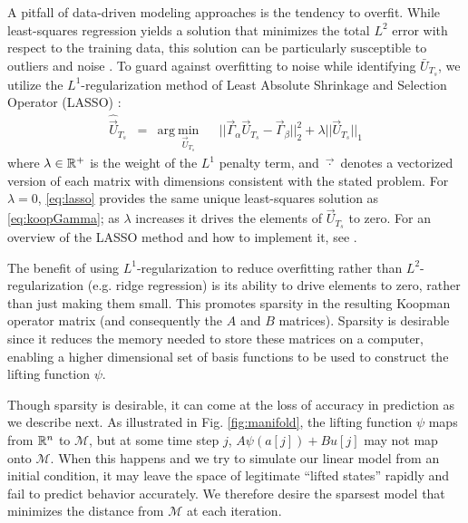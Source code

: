 A pitfall of data-driven modeling approaches is the tendency to overfit.
While least-squares regression yields a solution that minimizes the total $L^2$ error with respect to the training data, this solution can be particularly susceptible to outliers and noise \cite{rousseeuw2005robust}.
To guard against overfitting to noise while identifying $\bar{U}_{T_s}$, we utilize the $L^1$-regularization method of Least Absolute Shrinkage and Selection Operator (LASSO) \cite{tibshirani1996regression}:
\begin{equation}
\begin{aligned}
\hat{\vec{U}}_{T_s} &= 
& \text{arg}~\underset{ \vec{U}_{T_s} }{\text{min}}
& & || \vec{\Gamma}_\alpha \vec{U}_{T_s} - \vec{\Gamma}_\beta ||_2^2 + \lambda || \vec{U}_{T_s} ||_1
\label{eq:lasso}
\end{aligned}
\end{equation}
where $\lambda \in \mathbb{R}^{+}$ is the weight of the $L^1$ penalty term, and $\vec{\cdot}$ denotes a vectorized version of each matrix with dimensions consistent with the stated problem.
For $\lambda = 0$, \eqref{eq:lasso} provides the same unique least-squares solution as \eqref{eq:koopGamma}; as $\lambda$ increases it drives the elements of $\vec{U}_{T_s}$ to zero.
For an overview of the LASSO method and how to implement it, see \citet{tibshirani1996regression}.

The benefit of using $L^1$-regularization to reduce overfitting rather than $L^2$-regularization (e.g. ridge regression) is its ability to drive elements to zero, rather than just making them small.
This promotes sparsity in the resulting Koopman operator matrix (and consequently the $A$ and $B$ matrices).
Sparsity is desirable since it reduces the memory needed to store these matrices on a computer, enabling a higher dimensional set of basis functions to be used to construct the lifting function $\psi$.

Though sparsity is desirable, it can come at the loss of accuracy in prediction as we describe next. 
As illustrated in Fig. \ref{fig:manifold}, the lifting function $\psi$ maps from $\mathbb{R}^n$ to $\mathcal{M}$, but at some time step $j$, $A\psi(a[j]) + B u[j]$ may not map onto $\mathcal{M}$.
When this happens and we try to simulate our linear model from an initial condition, it may leave the space of legitimate ``lifted states'' rapidly and fail to predict behavior accurately.
We therefore desire the sparsest model that minimizes the distance from $\mathcal{M}$ at each iteration.

